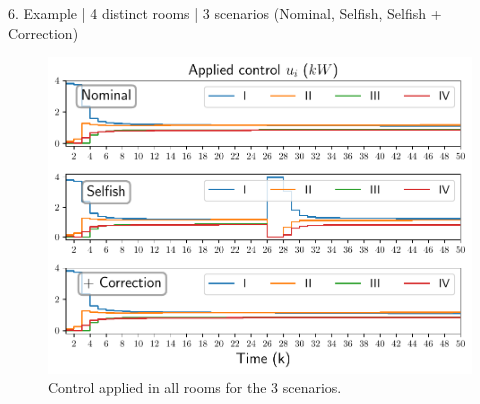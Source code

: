 \documentclass[presentation]{beamer}
\begin{document}
\begin{frame}
\begin{textblock}{15.6}
\begin{block}{6. Example | 4 distinct rooms | 3 scenarios (Nominal, Selfish, Selfish + Correction) }
\begin{minipage}[c]{26cm}
\begin{figure}[h]
          \includegraphics[width=\textwidth]{../img/airtemp_roomI/control_poster.pdf}
          \caption{\centering Control applied in all rooms for the 3 scenarios.}\label{fig:control_3Scenarios}
        \end{figure}
      \end{minipage}
      \hfill
    \end{block}
  \end{textblock}

\end{frame}
\end{document}
